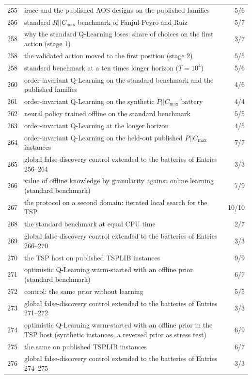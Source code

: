 \begin{table}[t]
{\begin{tabular}{@{}lp{}r@{}}
255 & irace and the published AOS designs on the published families & 5/6 \\
256 & standard $R||C_{\max}$ benchmark of Fanjul-Peyro and Ruiz & 5/7 \\
258 & why the standard Q-Learning loses: share of choices on the first action (stage 1) & 3/7 \\
258 & the validated action moved to the first position (stage 2) & 5/5 \\
258 & standard benchmark at a ten times longer horizon ($T=10^4$) & 5/6 \\
260 & order-invariant Q-Learning on the standard benchmark and the published families & 4/6 \\
261 & order-invariant Q-Learning on the synthetic $P||C_{\max}$ battery & 4/4 \\
262 & neural policy trained offline on the standard benchmark & 5/5 \\
263 & order-invariant Q-Learning at the longer horizon & 4/5 \\
264 & order-invariant Q-Learning on the held-out published $P||C_{\max}$ instances & 7/7 \\
265 & global false-discovery control extended to the batteries of Entries 256--264 & 3/3 \\
266 & value of offline knowledge by granularity against online learning (standard benchmark) & 7/9 \\
267 & the protocol on a second domain: iterated local search for the TSP & 10/10 \\
268 & the standard benchmark at equal CPU time & 2/7 \\
269 & global false-discovery control extended to the batteries of Entries 266--270 & 3/3 \\
270 & the TSP host on published TSPLIB instances & 9/9 \\
271 & optimistic Q-Learning warm-started with an offline prior (standard benchmark) & 6/7 \\
272 & control: the same prior without learning & 5/5 \\
273 & global false-discovery control extended to the batteries of Entries 271--272 & 3/3 \\
274 & optimistic Q-Learning warm-started with an offline prior in the TSP host (synthetic instances, a reversed prior as stress test) & 6/9 \\
275 & the same on published TSPLIB instances & 6/7 \\
276 & global false-discovery control extended to the batteries of Entries 274--275 & 3/3 \\

\end{tabular}}
\end{table}
